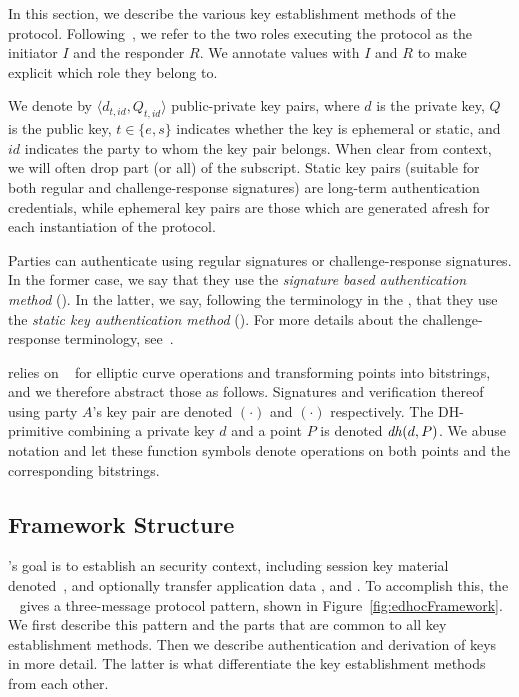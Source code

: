 In this section, we describe the various key establishment methods of the \mEdhoc{} protocol.
%
Following~\cite{Norr21}, we refer to the two roles executing the protocol as the initiator $I$ and the responder $R$.
%
We annotate values with $I$ and $R$ to make explicit which role they belong to.
%

We denote by $\langle d_{t, \mathit{id}}, Q_{t, \mathit{id}}\rangle$ public-private key pairs, where $d$ is the private key, $Q$ is the public key, $t \in \{e, s\}$ indicates whether the key is ephemeral or static, and $\mathit{id}$ indicates the party to whom the key pair belongs.
%
When clear from context, we will often drop part (or all) of the subscript.
%
Static key pairs (suitable for both regular and challenge-response signatures) are long-term authentication credentials, while ephemeral key pairs are those which are generated afresh for each instantiation of the protocol.
%

Parties can authenticate using regular signatures or challenge-response signatures. 
%
In the former case, we say that they use the \emph{signature based authentication method} (\mSig{}).
%
In the latter, we say, following the terminology in the \mSpec{}, that they use the \emph{static key authentication method} (\mStat{}).
%
For more details about the challenge-response terminology, see~\cite{DBLP:conf/crypto/Krawczyk05}.

%

\mEdhoc{} relies on \mCose{}~\cite{rfc8152} for elliptic curve operations and
transforming points into bitstrings, and we therefore abstract those as
follows.
%
Signatures and verification thereof using party $A$'s key pair are
denoted $(\cdot)$ and $(\cdot)$ respectively.
%
The DH-primitive combining a private key $d$ and a point $P$ is denoted
$\mathit{dh}(d,P)$.
%
We abuse notation and let these function symbols denote operations on both
points and the corresponding bitstrings.
%

\subsection{Framework Structure}
\label{sec:framework}
\mEdhoc{}'s goal is to establish an \mOscore{} security context,
including session key material \mbox{denoted \mSessKey{}}, and optionally transfer
application data \mADone{}, \mADtwo{} and \mADthree{}.
%
To accomplish this, the
\mSpec{}~\cite{our-analysis-selander-lake-edhoc-00} gives
a three-message protocol pattern, shown in Figure~\ref{fig:edhocFramework}.
%
We first describe this pattern and the parts that are common to all key
establishment methods.
%
Then we describe authentication and derivation of keys in more detail.
%
The latter is what differentiate the key establishment methods from each other.
%


